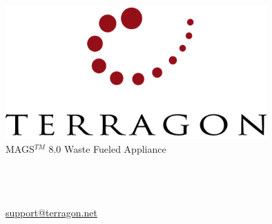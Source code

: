 \begin{titlepage}
\begin{minipage}{0.98\textwidth}
\vfill
    \begin{center}
    \includegraphics[width=10cm]{pictures/terragon.png}\\
    \vspace{3cm}
    {\fontsize{50}{60}\selectfont \textcolor{terragon}{MAGS$^{TM}$ 8.0}}
    \wl
    {\Huge \textcolor{terragon}{Waste Fueled Appliance}}\\
    \end{center}
\end{minipage}

\vspace{3cm}

\begin{center}
\textcolor{terragon}{
{\huge
\textbf{\underline{{\reporttype}}}\\
\wl
}
\textbf{%
\Large
\underline{\rev} \\
\wl
\underline{\release}\\
\wl
}}
{\Large
\underline{\textcolor{red}{\href{mailto:support@terragon.net}{support@terragon.net}}}}\\
\end{center}

\end{titlepage}